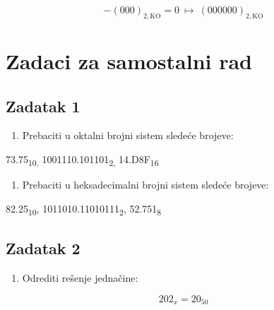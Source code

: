 \documentclass[a4paper,11pt]{article}
\numberwithin{equation}{section}
\begin{document}
\begin{equation}\label{eq:2.7.13}
-(000)_{2,\mathrm{KO}}=0\ \longmapsto\ (000000)_{2,\mathrm{KO}}
\end{equation}

\FloatBarrier
\clearpage
\section{Zadaci za samostalni rad}\label{sec:3}


\FloatBarrier
\subsection{Zadatak 1}\label{sec:3.1}


\begin{enumerate}[label=\alph*),start=1,leftmargin=*]
\item Prebaciti u oktalni brojni sistem sledeće brojeve:

\end{enumerate}


73.75\textsubscript{10,} 1001110.101101\textsubscript{2,} 14.D8F\textsubscript{16}



\begin{enumerate}[label=\alph*),start=2,leftmargin=*]
\item Prebaciti u heksadecimalni brojni sistem sledeće brojeve:

\end{enumerate}


82.25\textsubscript{10}, 1011010.11010111\textsubscript{2}, 52.751\textsubscript{8}



\FloatBarrier
\subsection{Zadatak 2}\label{sec:3.2}


\begin{enumerate}[label=\alph*),start=1,leftmargin=*]
\item Odrediti rešenje jednačine:

\end{enumerate}


\begin{equation}\label{eq:3.2.1}
202_{x} = 20_{50}
\end{equation}
\end{document}
